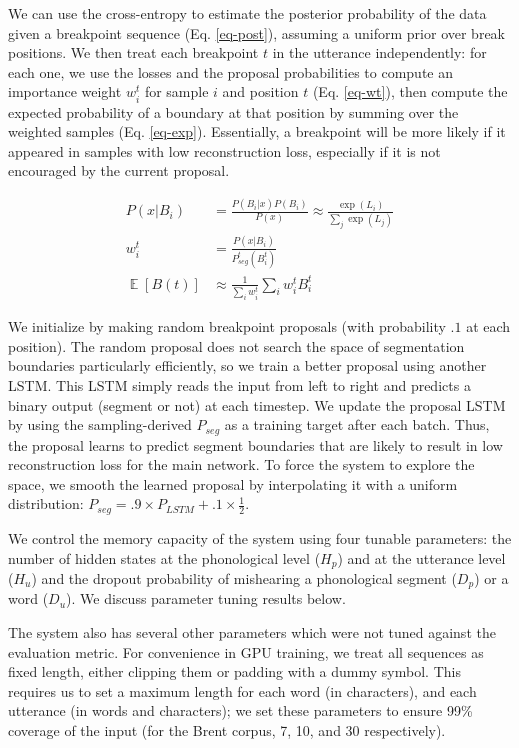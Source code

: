 \documentclass[11pt,letterpaper]{article}
\DeclareMathOperator*{\Exp}{\mathbb{E}}
\begin{document}
We can use the cross-entropy to estimate the posterior probability of
the data given a breakpoint sequence (Eq. \ref{eq-post}), assuming a
uniform prior over break positions. We then treat each breakpoint $t$
in the utterance independently: for each one, we use the losses and
the proposal probabilities to compute an importance weight $w_i^t$ for
sample $i$ and position $t$ (Eq. \ref{eq-wt}), then compute the
expected probability of a boundary at that position by summing over
the weighted samples (Eq. \ref{eq-exp}).  Essentially, a breakpoint
will be more likely if it appeared in samples with low reconstruction
loss, especially if it is not encouraged by the current proposal.

\begin{align}
P(x|B_i) &= \frac{P(B_i|x)P(B_i)}{P(x)} \approx \frac{\exp(L_i)}{\sum_j
  \exp(L_j)}
\label{eq-post}\\
w_i^t &= \frac{P(x|B_i)}{P_{seg}^t(B_i^t)}
\label{eq-wt}\\
\Exp[B(t)] &\approx \frac{1}{\sum_i w_i^t} \sum_i w_i^t B_i^t
\label{eq-exp}
\end{align}

We initialize by making random breakpoint proposals (with probability
$.1$ at each position). The random proposal does not search the space
of segmentation boundaries particularly efficiently, so we train a
better proposal using another LSTM. This LSTM simply reads the input
from left to right and predicts a binary output (segment or not) at
each timestep. We update the proposal LSTM by using the
sampling-derived $P_{seg}$ as a training target after each
batch. Thus, the proposal learns to predict segment boundaries that
are likely to result in low reconstruction loss for the main
network. To force the system to explore the space, we smooth the
learned proposal by interpolating it with a uniform distribution:
$P_{seg} = .9 \times P_{LSTM} + .1 \times \frac{1}{2}$.

We control the memory capacity of the system using four tunable
parameters: the number of hidden states at the phonological level
($H_p$) and at the utterance level ($H_u$) and the dropout probability
of mishearing a phonological segment ($D_p$) or a word ($D_u$). We
discuss parameter tuning results below.

The system also has several other parameters which were not tuned
against the evaluation metric. For convenience in GPU training, we
treat all sequences as fixed length, either clipping them or padding
with a dummy symbol. This requires us to set a maximum length for each
word (in characters), and each utterance (in words and characters); we
set these parameters to ensure 99\% coverage of the input (for the
Brent corpus, 7, 10, and 30 respectively).
\end{document}
